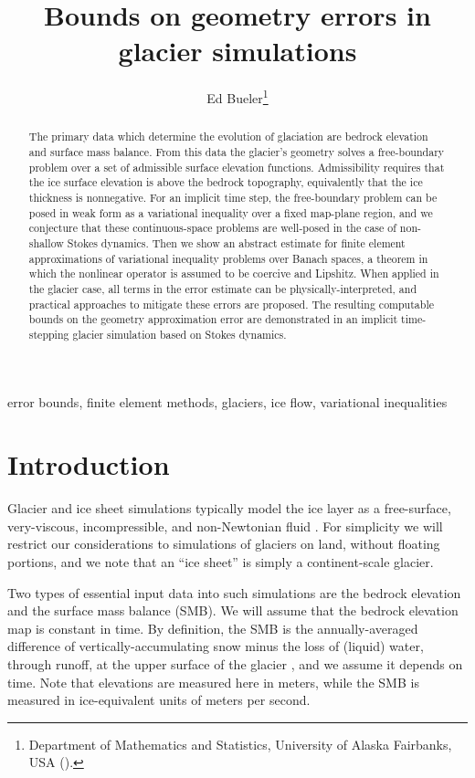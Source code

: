 \documentclass[hidelinks,onefignum,onetabnum,final]{siamart220329}  %
\title{Bounds on geometry errors in glacier simulations}
\author{Ed Bueler\thanks{Department of Mathematics and Statistics, University of Alaska Fairbanks, USA (\email{elbueler@alaska.edu}).}}
\begin{document}
\maketitle

\begin{abstract}
The primary data which determine the evolution of glaciation are bedrock elevation and surface mass balance.  From this data the glacier's geometry solves a free-boundary problem over a set of admissible surface elevation functions.  Admissibility requires that the ice surface elevation is above the bedrock topography, equivalently that the ice thickness is nonnegative.  For an implicit time step, the free-boundary problem can be posed in weak form as a variational inequality over a fixed map-plane region, and we conjecture that these continuous-space problems are well-posed in the case of non-shallow Stokes dynamics.  Then we show an abstract estimate for finite element approximations of variational inequality problems over Banach spaces, a theorem in which the nonlinear operator is assumed to be coercive and Lipshitz.  When applied in the glacier case, all terms in the error estimate can be physically-interpreted, and practical approaches to mitigate these errors are proposed.  The resulting computable bounds on the geometry approximation error are demonstrated in an implicit time-stepping glacier simulation based on Stokes dynamics.
\end{abstract}

\begin{keywords}
error bounds, finite element methods, glaciers, ice flow, variational inequalities
\end{keywords}



\section{Introduction} \label{sec:intro}

Glacier and ice sheet simulations typically model the ice layer as a free-surface, very-viscous, incompressible, and non-Newtonian fluid \cite{GreveBlatter2009,SchoofHewitt2013}.  For simplicity we will restrict our considerations to simulations of glaciers on land, without floating portions, and we note that an ``ice sheet'' is simply a continent-scale glacier.

Two types of essential input data into such simulations are the bedrock elevation and the surface mass balance (SMB).  We will assume that the bedrock elevation map is constant in time.  By definition, the SMB is the annually-averaged difference of vertically-accumulating snow minus the loss of (liquid) water, through runoff, at the upper surface of the glacier \cite{Cogleyetal2011}, and we assume it depends on time.  Note that elevations are measured here in meters, while the SMB is measured in ice-equivalent units of meters per second.
\end{document}
